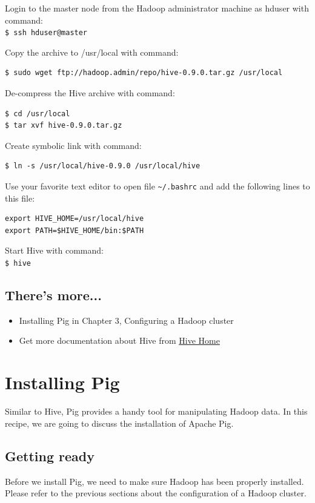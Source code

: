 Login to the master node from the Hadoop administrator machine as hduser with command: \\
\verb|$ ssh hduser@master|

Copy the archive to /usr/local with command:
\lstset{style=bashstyle}
\begin{lstlisting}
$ sudo wget ftp://hadoop.admin/repo/hive-0.9.0.tar.gz /usr/local
\end{lstlisting}

De-compress the Hive archive with command:
\lstset{style=bashstyle}
\begin{lstlisting}
$ cd /usr/local
$ tar xvf hive-0.9.0.tar.gz
\end{lstlisting}

Create symbolic link with command:
\lstset{style=bashstyle}
\begin{lstlisting}
$ ln -s /usr/local/hive-0.9.0 /usr/local/hive
\end{lstlisting}

Use your favorite text editor to open file \verb|~/.bashrc| and add the following lines to this file:
\lstset{style=bashstyle}
\begin{lstlisting}
export HIVE_HOME=/usr/local/hive
export PATH=$HIVE_HOME/bin:$PATH
\end{lstlisting}

Start Hive with command: \\
\verb|$ hive|
\subsection*{There's more...}
\begin{itemize}
  \item Installing Pig in Chapter 3, Configuring a Hadoop cluster
  \item Get more documentation about Hive from \href{https://cwiki.apache.org/confluence/display/Hive/Home}{Hive Home}
\end{itemize}

\section{Installing Pig}
Similar to Hive, Pig provides a handy tool for manipulating Hadoop data. In this recipe, we are going to discuss the installation of Apache Pig.
\subsection*{Getting ready}
Before we install Pig, we need to make sure Hadoop has been properly installed. Please refer to the previous sections about the configuration of a Hadoop cluster.

